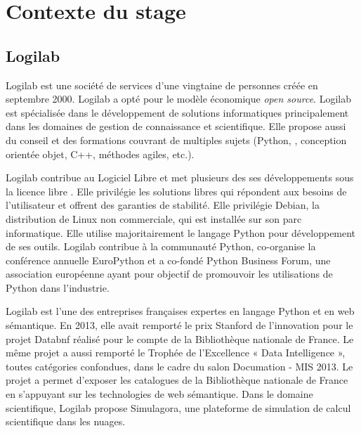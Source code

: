 \chapter{Contexte du stage}
\section{Logilab}
Logilab est une société de services d'une vingtaine de personnes créée en septembre 2000. Logilab a opté pour le modèle économique \textit{open source}. Logilab est spécialisée dans le développement de solutions informatiques principalement dans les domaines de gestion de connaissance et scientifique. Elle propose aussi du conseil et des formations couvrant de multiples sujets (Python, , conception orientée objet, C++, méthodes agiles, etc.).

Logilab contribue au Logiciel Libre et met plusieurs des ses développements sous la licence libre . Elle privilégie les solutions libres qui répondent aux besoins de l'utilisateur et offrent des garanties de stabilité. Elle privilégie Debian, la distribution de Linux non commerciale, qui est installée sur son parc informatique. Elle utilise majoritairement le langage Python pour développement de ses outils. Logilab contribue à la communauté Python, co-organise la conférence annuelle EuroPython et a co-fondé Python Business Forum, une association européenne ayant pour objectif de promouvoir les utilisations de Python dans l'industrie.

Logilab est l'une des entreprises françaises expertes en langage Python et en web sémantique. En 2013, elle avait remporté le prix Stanford de l'innovation pour le projet Databnf réalisé pour le compte de la Bibliothèque nationale de France. Le même projet a aussi remporté le Trophée de l'Excellence « Data Intelligence », toutes catégories confondues, dans le cadre du salon Documation - MIS 2013\cite{dta}. Le projet a permet d'exposer les catalogues de la Bibliothèque nationale de France en s’appuyant sur les technologies de web sémantique. Dans le domaine scientifique, Logilab propose Simulagora, une plateforme de simulation de calcul scientifique dans les nuages.


